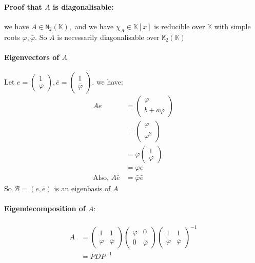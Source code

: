 \documentclass[]{article}
\begin{document}
\paragraph{Proof that $A$ is diagonalisable:} we have $A\in\mathtt{M}_2(\mathbb{K}),$ and we have $\chi_A\in\mathbb{K}[x]$ is reducible over $\mathbb{K}$ with simple roots $\varphi,\bar\varphi.$ So $A$ is necessarily diagonalisable over $\mathtt{M}_2(\mathbb{K})$

\paragraph{Eigenvectors of $A$}
Let $e=\begin{pmatrix}
	1 \\ \varphi
\end{pmatrix},\bar e = \begin{pmatrix}
1 \\ \bar{\varphi}
\end{pmatrix}.$ we have:
\begin{align*}
	Ae&=\begin{pmatrix}
		\varphi \\
		b + a\varphi
	\end{pmatrix} \\
&= \begin{pmatrix}
	\varphi \\
	\varphi^2
\end{pmatrix}\\
&= \varphi \begin{pmatrix}
	1 \\
	\varphi
\end{pmatrix}\\
&= \varphi e \\
\text{Also, }A \bar e &= \bar{\varphi}\bar e
\end{align*}
So $\mathscr{B}=(e,\bar e)$ is an eigenbasis of $A$
\paragraph{Eigendecomposition of $A:$}
\begin{align*} \tag{3.a}
	A &= \begin{pmatrix}
		1 & 1 \\ \varphi & \bar\varphi 
	\end{pmatrix} \begin{pmatrix}
	\varphi & 0 \\ 0 & \bar \varphi
\end{pmatrix}\begin{pmatrix}
1 & 1 \\ \varphi & \bar\varphi
\end{pmatrix}^{-1} \\
&= PDP^{-1}
\end{align*}
\end{document}
